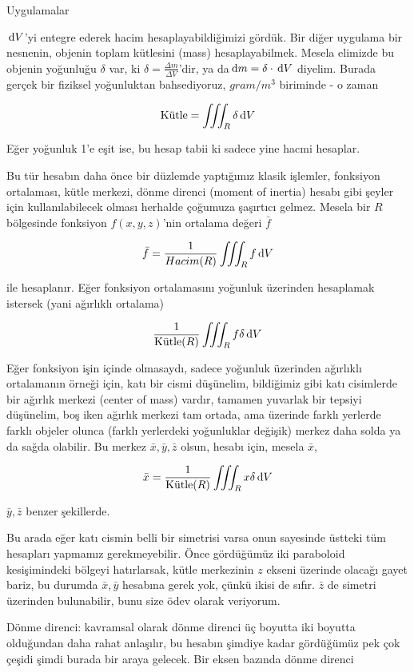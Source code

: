 \documentclass[12pt,fleqn]{article}\usepackage{../../common}
\begin{document}
Uygulamalar 

$\,\mathrm{d} V$'yi entegre ederek hacim hesaplayabildiğimizi gördük. Bir diğer
uygulama bir nesnenin, objenin toplam kütlesini (mass)
hesaplayabilmek. Mesela elimizde bu objenin yoğunluğu $\delta$ var, ki
$\delta = \frac{\Delta m}{\Delta V}$'dir, ya da$\,\mathrm{d} m = \delta \cdot \,\mathrm{d} V$
diyelim. Burada gerçek bir fiziksel yoğunluktan bahsediyoruz, $gram / m^3$
biriminde - o zaman

$$ 
\textrm{Kütle} = \iiint_R \delta \,\mathrm{d} V
$$

Eğer yoğunluk 1'e eşit ise, bu hesap tabii ki sadece yine hacmi
hesaplar. 

Bu tür hesabın daha önce bir düzlemde yaptığımız klasik işlemler, fonksiyon
ortalaması, kütle merkezi, dönme direnci (moment of inertia) hesabı gibi
şeyler için kullanılabilecek olması herhalde çoğumuza şaşırtıcı
gelmez. Mesela bir $R$ bölgesinde fonksiyon $f(x,y,z)$'nin ortalama değeri
$\bar{f}$

$$ 
\bar{f} = \frac{1}{Hacim(R)} \iiint_R f \,\mathrm{d} V
$$
 
ile hesaplanır. Eğer fonksiyon ortalamasını yoğunluk üzerinden hesaplamak
istersek (yani ağırlıklı ortalama)

$$ 
\frac{1}{\textrm{Kütle}(R)} \iiint_R f \delta \,\mathrm{d} V
$$

Eğer fonksiyon işin içinde olmasaydı, sadece yoğunluk üzerinden ağırlıklı
ortalamanın örneği için, katı bir cismi düşünelim, bildiğimiz gibi katı
cisimlerde bir ağırlık merkezi (center of mass) vardır, tamamen yuvarlak
bir tepsiyi düşünelim, boş iken ağırlık merkezi tam ortada, ama üzerinde
farklı yerlerde farklı objeler olunca (farklı yerlerdeki yoğunluklar
değişik) merkez daha solda ya da sağda olabilir. Bu merkez
$\bar{x},\bar{y},\bar{z}$ olsun, hesabı için, mesela $\bar{x}$,

$$ 
\bar{x} = \frac{1}{\textrm{Kütle}(R)} \iiint_R x \delta \,\mathrm{d} V
$$

$\bar{y},\bar{z}$ benzer şekillerde.

Bu arada eğer katı cismin belli bir simetrisi varsa onun sayesinde üstteki
tüm hesapları yapmamız gerekmeyebilir. Önce gördüğümüz iki paraboloid
kesişimindeki bölgeyi hatırlarsak, kütle merkezinin $z$ ekseni üzerinde
olacağı gayet bariz, bu durumda $\bar{x},\bar{y}$ hesabına gerek yok, çünkü
ikisi de sıfır. $\bar{z}$ de simetri üzerinden bulunabilir, bunu size ödev
olarak veriyorum. 

Dönme direnci: kavramsal olarak dönme direnci üç boyutta iki boyutta
olduğundan daha rahat anlaşılır, bu hesabın şimdiye kadar gördüğümüz pek
çok çeşidi şimdi burada bir araya gelecek. Bir eksen bazında dönme direnci
\end{document}
